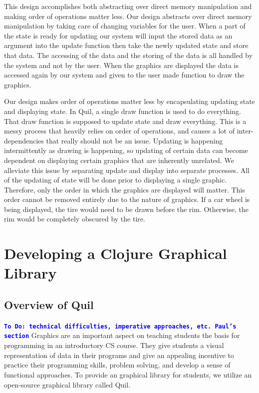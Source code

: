 \documentclass[12pt]{article}
\newcommand{\comment}[1]{{\bf \tt  {#1}}}
\newcommand{\todo}[1]{\textcolor{blue}{\comment{To Do: {#1}}}}
\begin{document}
This design accomplishes both abstracting over direct memory manipulation and making order of operations matter less. Our design abstracts over direct memory manipulation by taking care of changing variables for the user. When a part of the state is ready for updating our system will input the stored data as an argument into the update function then take the newly updated state and store that data. The accessing of the data and the storing of the data is all handled by the system and not by the user. When the graphics are displayed the data is accessed again by our system and given to the user made function to draw the graphics. 

Our design makes order of operations matter less by encapsulating updating state and displaying state. In Quil, a single draw function is used to do everything. That draw function is supposed to update state and draw everything. This is a messy process that heavily relies on order of operations, and causes a lot of inter-dependencies that really should not be an issue. Updating is happening intermittently as drawing is happening, so updating of certain data can become dependent on displaying certain graphics that are inherently unrelated. We alleviate this issue by separating update and display into separate processes. All of the updating of state will be done prior to displaying a single graphic. Therefore, only the order in which the graphics are displayed will matter. This order cannot be removed entirely due to the nature of graphics. If a car wheel is being displayed, the tire would need to be drawn before the rim. Otherwise, the rim would be completely obscured by the tire.

\section{Developing a Clojure Graphical Library}\label{sec:library}

\subsection{Overview of Quil}\label{subsec:quil}
\todo{technical difficulties, imperative approaches, etc. Paul's section}
Graphics are an important aspect on teaching students the basis for programming in an introductory CS course. They give students a visual representation of data in their programs and give an appealing incentive to practice their programming skills, problem solving, and develop a sense of functional approaches. To provide an graphical library for students, we utilize an open-source graphical library called Quil.
\end{document}

